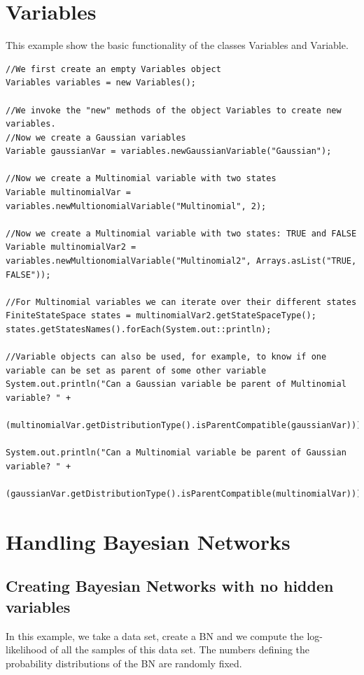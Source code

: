 \section{Variables}


This example show the basic functionality of the classes Variables and Variable.

\begin{lstlisting}
//We first create an empty Variables object
Variables variables = new Variables();

//We invoke the "new" methods of the object Variables to create new variables.
//Now we create a Gaussian variables
Variable gaussianVar = variables.newGaussianVariable("Gaussian");

//Now we create a Multinomial variable with two states
Variable multinomialVar = variables.newMultionomialVariable("Multinomial", 2);

//Now we create a Multinomial variable with two states: TRUE and FALSE
Variable multinomialVar2 = variables.newMultionomialVariable("Multinomial2", Arrays.asList("TRUE, FALSE"));

//For Multinomial variables we can iterate over their different states
FiniteStateSpace states = multinomialVar2.getStateSpaceType();
states.getStatesNames().forEach(System.out::println);

//Variable objects can also be used, for example, to know if one variable can be set as parent of some other variable
System.out.println("Can a Gaussian variable be parent of Multinomial variable? " +
        (multinomialVar.getDistributionType().isParentCompatible(gaussianVar)));

System.out.println("Can a Multinomial variable be parent of Gaussian variable? " +
        (gaussianVar.getDistributionType().isParentCompatible(multinomialVar)));
\end{lstlisting}



\section{Handling Bayesian Networks}


\subsection{Creating Bayesian Networks with no hidden variables}

In this example, we take a data set, create a BN and we compute the log-likelihood of all the samples
of this data set. The numbers defining the probability distributions of the BN are randomly fixed.

